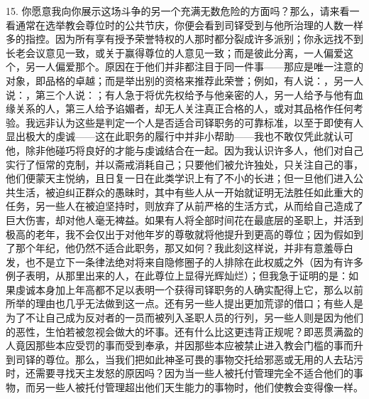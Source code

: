 15. 你愿意我向你展示这场斗争的另一个充满无数危险的方面吗？那么，请来看一看通常在选举教会尊位时的公共节庆，你便会看到司铎受到与他所治理的人数一样多的指控。因为所有享有授予荣誉特权的人那时都分裂成许多派别；你永远找不到长老会议意见一致，或关于赢得尊位的人意见一致；而是彼此分离，一人偏爱这个，另一人偏爱那个。原因在于他们并非都注目于同一件事——那应是唯一注意的对象，即品格的卓越；而是举出别的资格来推荐此荣誉；例如，有人说：，另一人说：，第三个人说：；有人急于将优先权给予与他亲密的人，另一人给予与他有血缘关系的人，第三人给予谄媚者，却无人关注真正合格的人，或对其品格作任何考验。我远非认为这些是判定一个人是否适合司铎职务的可靠标准，以至于即使有人显出极大的虔诚——这在此职务的履行中并非小帮助——我也不敢仅凭此就认可他，除非他碰巧将良好的才能与虔诚结合在一起。因为我认识许多人，他们对自己实行了恒常的克制，并以斋戒消耗自己；只要他们被允许独处，只关注自己的事，他们便蒙天主悦纳，且日复一日在此类学识上有了不小的长进；但一旦他们进入公共生活，被迫纠正群众的愚昧时，其中有些人从一开始就证明无法胜任如此重大的任务，另一些人在被迫坚持时，则放弃了从前严格的生活方式，从而给自己造成了巨大伤害，却对他人毫无裨益。如果有人将全部时间花在最底层的圣职上，并活到极高的老年，我不会仅出于对他年岁的尊敬就将他提升到更高的尊位；因为假如到了那个年纪，他仍然不适合此职务，那又如何？我此刻这样说，并非有意羞辱白发，也不是立下一条律法绝对将来自隐修圈子的人排除在此权威之外（因为有许多例子表明，从那里出来的人，在此尊位上显得光辉灿烂）；但我急于证明的是：如果虔诚本身加上年高都不足以表明一个获得司铎职务的人确实配得上它，那么以前所举的理由也几乎无法做到这一点。还有另一些人提出更加荒谬的借口；有些人是为了不让自己成为反对者的一员而被列入圣职人员的行列，另一些人则是因为他们的恶性，生怕若被忽视会做大的坏事。还有什么比这更违背正规呢？即恶贯满盈的人竟因那些本应受罚的事而受到奉承，并因那些本应被禁止进入教会门槛的事而升到司铎的尊位。那么，当我们把如此神圣可畏的事物交托给邪恶或无用的人去玷污时，还需要寻找天主发怒的原因吗？因为当一些人被托付管理完全不适合他们的事物，而另一些人被托付管理超出他们天生能力的事物时，他们使教会变得像一样。\par

